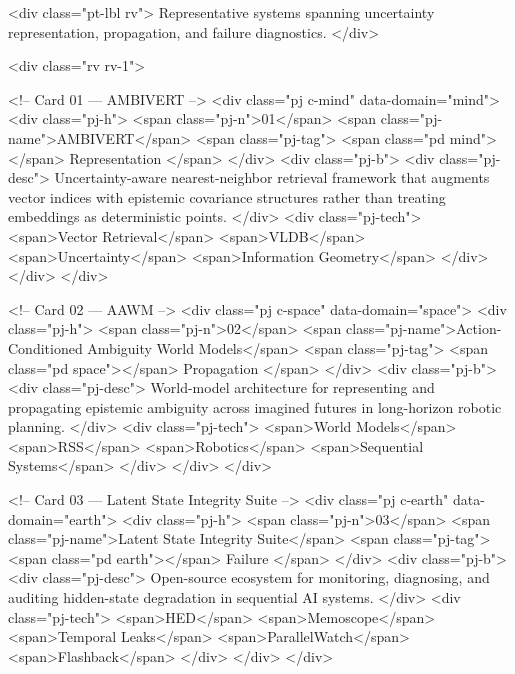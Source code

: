   <div class="pt-lbl rv">
    Representative systems spanning uncertainty representation, propagation, and failure diagnostics.
  </div>

  <div class="rv rv-1">
    
    <!-- Card 01 — AMBIVERT -->
    <div class="pj c-mind" data-domain="mind">
      <div class="pj-h">
        <span class="pj-n">01</span>
        <span class="pj-name">AMBIVERT</span>
        <span class="pj-tag">
          <span class="pd mind"></span>
          Representation
        </span>
      </div>
      <div class="pj-b">
        <div class="pj-desc">
          Uncertainty-aware nearest-neighbor retrieval framework that augments vector indices with epistemic covariance structures rather than treating embeddings as deterministic points.
        </div>
        <div class="pj-tech">
          <span>Vector Retrieval</span>
          <span>VLDB</span>
          <span>Uncertainty</span>
          <span>Information Geometry</span>
        </div>
      </div>
    </div>

    <!-- Card 02 — AAWM -->
    <div class="pj c-space" data-domain="space">
      <div class="pj-h">
        <span class="pj-n">02</span>
        <span class="pj-name">Action-Conditioned Ambiguity World Models</span>
        <span class="pj-tag">
          <span class="pd space"></span>
          Propagation
        </span>
      </div>
      <div class="pj-b">
        <div class="pj-desc">
          World-model architecture for representing and propagating epistemic ambiguity across imagined futures in long-horizon robotic planning.
        </div>
        <div class="pj-tech">
          <span>World Models</span>
          <span>RSS</span>
          <span>Robotics</span>
          <span>Sequential Systems</span>
        </div>
      </div>
    </div>

    <!-- Card 03 — Latent State Integrity Suite -->
    <div class="pj c-earth" data-domain="earth">
      <div class="pj-h">
        <span class="pj-n">03</span>
        <span class="pj-name">Latent State Integrity Suite</span>
        <span class="pj-tag">
          <span class="pd earth"></span>
          Failure
        </span>
      </div>
      <div class="pj-b">
        <div class="pj-desc">
          Open-source ecosystem for monitoring, diagnosing, and auditing hidden-state degradation in sequential AI systems.
        </div>
        <div class="pj-tech">
          <span>HED</span>
          <span>Memoscope</span>
          <span>Temporal Leaks</span>
          <span>ParallelWatch</span>
          <span>Flashback</span>
        </div>
      </div>
    </div>

